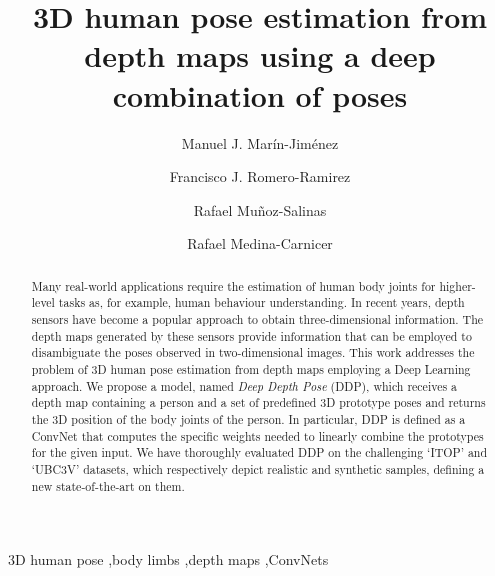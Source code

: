\documentclass[review,12pt,3p]{elsarticle}
\begin{document}
 



\begin{frontmatter}

\title{3D human pose estimation from depth maps using a deep combination of poses}


\author[label1,label2]{Manuel J. Mar\'in-Jim\'enez}
\address[label1]{Departamento de Inform\'atica y An\'alisis Num\'erico, Campus de Rabanales, Universidad de C\'ordoba, 14071, C\'ordoba, Spain}
\address[label2]{Instituto Maim\'onides de Investigaci\'on en Biomedicina (IMIBIC). Avenida Men\'endez Pidal s/n, 14004, C\'ordoba, Spain}

\author[label1]{Francisco J. Romero-Ramirez}

\author[label1,label2]{Rafael Mu\~noz-Salinas}

\author[label1,label2]{Rafael Medina-Carnicer}




\begin{abstract}
Many real-world applications require the estimation of human body joints for higher-level tasks as, for example, human behaviour understanding. In recent years, depth sensors have become a popular approach to obtain three-dimensional information. The depth maps generated by these sensors provide information that can be employed to disambiguate the poses observed in two-dimensional images. This work addresses the problem of 3D human pose estimation from depth maps employing a Deep Learning approach. We propose a model, named \textit{Deep Depth Pose} (DDP), which receives a depth map containing a person and a set of predefined 3D prototype poses  and returns the 3D position of the body joints of the person. In particular, DDP is defined as a ConvNet that computes the specific weights needed to linearly combine the prototypes for the given input.
We have thoroughly evaluated DDP on the challenging `ITOP' and `UBC3V' datasets, which respectively depict  realistic and synthetic samples, defining a new state-of-the-art on them.
\end{abstract}

\begin{keyword}
3D human pose \sep body limbs \sep depth maps \sep ConvNets   %

\end{keyword}

\end{frontmatter}
\end{document}
